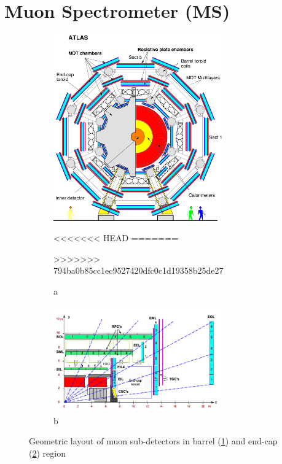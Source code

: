 \section{Muon Spectrometer (MS)}
\label{sec:muon}
\begin{figure}[htbp!]
\begin{subfigure}{.5\textwidth}
 \centering
 \includegraphics[width=0.8\textwidth]{chapters/c4/figures/mu-bar}
 \caption{a }
<<<<<<< HEAD
=======

>>>>>>> 794ba0b85cc1ec9527420dfc0c1d19358b25de27
 \label{fig:mu-bar}
\end{subfigure}%
\begin{subfigure}{.5\textwidth}
 \centering
 \includegraphics[width=0.8\textwidth]{chapters/c4/figures/mu-end}
 \caption{b}
 \label{fig:mu-end}
\end{subfigure}
 \caption{Geometric layout of muon sub-detectors in barrel (\ref{fig:mu-bar}) and end-cap (\ref{fig:mu-end}) region}
\label{fig:mu}
\end{figure}


